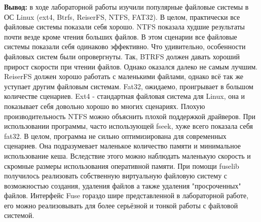 \documentclass[a4paper,14pt]{extarticle}
\begin{document}
\textbf{Вывод: } в ходе лабораторной работы изучили популярные файловые системы в ОС Linux (ext4, Btrfs, ReiserFS, NTFS,
FAT32). В целом, практически все файловые системы показали себя хорошо. NTFS показала худшие результаты почти везде
кроме чтения больших файлов. В этом сценарии все файловые системы показали себя одинаково эффективно. 
Что удивительно, особенности файловых систем были опровергнуты. Так, BTRFS должен давать хороший прирост скорости 
при чтении файлов. Однако оказался далеко не самым лучшим. ReiserFS должен хорошо работать с маленькими файлами, однако
всё так же уступает другим файловым системам. Fat32, ожидаемо, проигрывает в большом количестве сценариев. Ext4 - стандартная
файловая система для Linux, она и показывает себя довольно хорошо во многих сценариях. Плохую производительность NTFS можно
объяснить плохой поддержкой драйверов. При использовании
программы, часто использующей fseek, хуже всего показала себя fat32. В целом, программа не сильно оптимизирована для современных сценариев. 
Она подразумевает маленькое количество памяти и минимальное использование кеша. Вследствие этого можно наблюдать маленькую скорость и скромные
размеры использования оперативной памяти. При помощи fuselib получилось реализовать собственную виртуальную файловую систему с 
возможностью создания, удаления файлов а также удаления "просроченных" файлов. Интерфейс Fuse гораздо шире представленной в 
лабораторной работе, его можно реализовывать для более серьёзной и тонкой работы с файловой системой.
\end{document}
